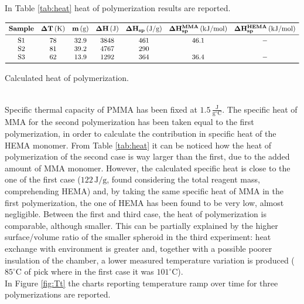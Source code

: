 \documentclass[a4paper, 11pt]{article}
\begin{document}
In Table \ref{tab:heat} heat of polymerization results are reported. 
\begin{table}[htp]
\centering
$
\begin{array}{ccccccc}
\toprule
\textbf{Sample} & \mathbf{\Delta T}\,(\text{K}) &  \mathbf{m}\,(\text{g}) & \mathbf{\Delta H}\,(\text{J}) & \mathbf{\Delta H_{sp}}\,(\text{J}/\text{g}) & \mathbf{\Delta H_{sp}^{MMA}}\,(\text{kJ}/\text{mol}) & \mathbf{\Delta H_{sp}^{HEMA}}\,(\text{kJ}/\text{mol}) \\
\midrule
\text{S1} & 78 & 32.9 & 3848 & 461 & 46.1 & -\\
\text{S2} & 81 & 39.2 & 4767 & 290 &  &  \\
\text{S3} & 62 & 13.9 & 1292 & 364 & 36.4 & - \\
\bottomrule
\end{array}
$
\caption{Calculated heat of polymerization.}
\label{tab:heat}
\end{table}\\
Specific thermal capacity of PMMA has been fixed at $1.5 \,\frac{\text{J}}{\text{g}^\circ\text{C}}$.
The specific heat of MMA for the second polymerization has been taken equal to the first polymerization, in order to calculate the contribution in specific heat of the HEMA monomer. From Table \ref{tab:heat} it can be noticed how the heat of polymerization of the second case is way larger than the first, due to the added amount of MMA monomer. However, the calculated specific heat is close to the one of the first case ($122\,\text{J}/\text{g}$, found considering the total reagent mass, comprehending HEMA) and, by taking the same specific heat of MMA in the first polymerization, the one of HEMA has been found to be very low, almost negligible. Between the first and third case, the heat of polymerization is comparable, although smaller. This can be partially explained by the higher surface/volume ratio of the smaller spheroid in the third experiment: heat exchange with environment is greater and, together with a possible poorer insulation of the chamber, a lower measured temperature variation is produced ($85^\circ$C of pick where in the first case it was $101^\circ$C). \\
In Figure \ref{fig:Tt} the charts reporting temperature ramp over time for three polymerizations are reported. 
\end{document}
